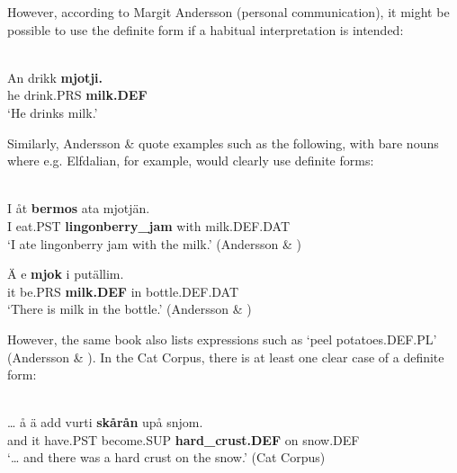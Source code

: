 \z

However, according to Margit Andersson (personal communication), it might be possible to use the definite form if a habitual interpretation is intended:


\ea \label{} 
\\
\gll An  drikk  \textbf{mjotji.}\\
he  drink.PRS  \textbf{milk.DEF}\\
\glt ‘He drinks milk.’ 

\z

Similarly, Andersson \& \citet{Danielsson1999} quote examples such as the following, with bare nouns where e.g. Elfdalian, for example, would clearly use definite forms:


\ea\label{}
\\
\gll I  åt  \textbf{bermos} ata  mjotjän.\\
I  eat.PST  \textbf{lingonberry\_jam} with  milk.DEF.DAT\\
\glt ‘I ate lingonberry jam with the milk.’ (Andersson \& \citet[373]{Danielsson1999})

\z

\ea
\gll Ä  e  \textbf{mjok} i  putällim.\\
it  be.PRS  \textbf{milk.DEF} in  bottle.DEF.DAT\\
\glt ‘There is milk in the bottle.’ (Andersson \& \citet[373]{Danielsson1999})

\z

However, the same book also lists expressions such as  ‘peel potatoes.DEF.PL’ (Andersson \& \citet[176]{Danielsson1999}). In the Cat Corpus, there is at least one clear case of a definite form:


\ea \label{} 
\\
\gll …  å  ä  add  vurti  \textbf{skårån} upå  snjom.\\
  and  it  have.PST  become.SUP  \textbf{hard\_crust.DEF} on  snow.DEF\\
\glt ‘… and there was a hard crust on the snow.’ (Cat Corpus)

